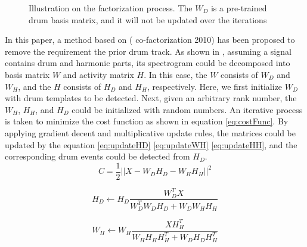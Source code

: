 \documentclass{article}
\begin{document}
\begin{figure}
 \centerline{}
 \caption{Illustration on the factorization process. The $W_D$ is a pre-trained drum basis matrix, and it will not be updated over the iterations }
 \label{fig:factorization}
\end{figure}

In this paper, a method based on (\cite{} co-factorization 2010) has been proposed to remove the requirement the prior drum track. As shown in , assuming a signal contains drum and harmonic parts, its spectrogram could be decomposed into basis matrix $W$ and activity matrix $H$. In this case, the $W$ consists of $W_D$ and $W_H$, and the $H$ consists of $H_D$ and $H_H$, respectively. Here, we first initialize $W_D$ with drum templates to be detected. Next, given an arbitrary rank number, the $W_H$, $H_H$, and $H_D$ could be initialized with random numbers. An iterative process is taken to minimize the cost function as shown in equation \eqref{eq:costFunc}. By applying gradient decent and multiplicative update rules, the matrices could be updated by the equation \eqref{eq:updateHD} \eqref{eq:updateWH} \eqref{eq:updateHH}, and the corresponding drum events could be detected from $H_D$.  
\begin{equation}
C = \frac{1}{2} || X - W_{D}H_{D} - W_{H}H_{H}||^{2}
\label{eq:costFunc}
\end{equation}

\begin{equation}
H_{D} \leftarrow H_{D}\frac{W_{D} ^T X}{W_{D}^T W_{D} H_{D} + W_{D} W_{H} H_{H}}
\label{eq:updateHD}
\end{equation}

\begin{equation}
W_{H} \leftarrow W_{H}\frac{X H_{H}^T}{W_{H} H_{H} H_{H}^T + W_{D} H_{D} H_{H}^T}
\label{eq:updateWH}
\end{equation}
\end{document}
